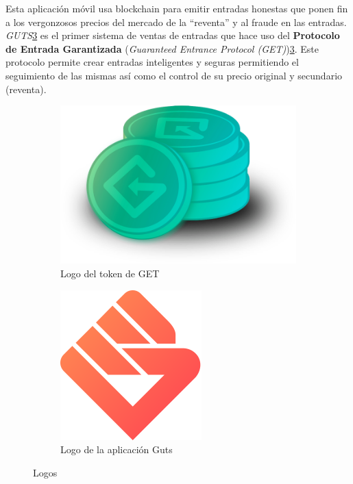 Esta aplicación móvil usa blockchain para emitir entradas honestas que ponen fin a los vergonzosos precios del mercado de la ``reventa'' y al fraude en las entradas. \emph{GUTS}\ref{fig:Logos} es el primer sistema de ventas de entradas que hace uso del \textbf{Protocolo de Entrada Garantizada} {\small (\textit{Guaranteed Entrance Protocol (GET)})}\cite{GET}\ref{fig:Logos}. Este protocolo permite crear entradas inteligentes y seguras permitiendo el seguimiento de las mismas así como el control de su precio original y secundario (reventa). 

\begin{figure}[hbt]
	\centering
	\begin{subfigure}[b]{0.4\linewidth}
		\centering
		\includegraphics[width=0.8\linewidth]{figs/EstadoArte/Apps/getTOKEN.png}
		\caption{Logo del token de GET}\label{fig:getTOKEN}
	\end{subfigure} 
	\begin{subfigure}[b]{0.4\linewidth}
		\centering
		\includegraphics[width=0.6\linewidth]{figs/EstadoArte/Apps/gutsLOGO.png}
		\caption{Logo de la aplicación Guts}\label{fig:gutsLOGO}
	\end{subfigure} 
	\caption[Logos de Guts y GET]{Logos}
	\label{fig:Logos}
\end{figure}

